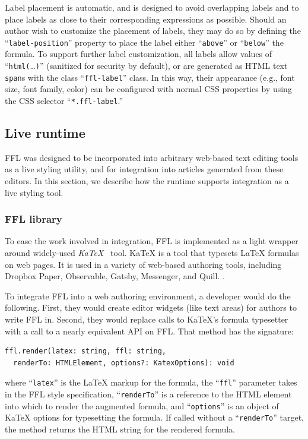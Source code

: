 Label placement is automatic, and is designed to avoid overlapping labels and to place labels as close to their corresponding expressions as possible.  Should an author wish to customize the placement of labels, they may do so by defining the ``\texttt{label-position}'' property to place the label either ``\texttt{above}'' or ``\texttt{below}'' the formula.  To support further label customization, all labels allow values of ``\texttt{html(}\dots\texttt{)}'' (sanitized for security by default), or are generated as HTML text \texttt{span}s with the class ``\texttt{ffl-label}'' class. In this way, their appearance (e.g., font size, font family, color) can be configured with normal CSS properties by using the CSS selector ``\texttt{*.ffl-label}.''

\subsection{Live runtime}

FFL was designed to be incorporated into arbitrary web-based text editing tools as a live styling utility, and for integration into articles generated from these editors. In this section, we describe how the runtime supports integration as a live styling tool.

\subsubsection{FFL library}

To ease the work involved in integration, FFL is implemented as a light wrapper around widely-used \textit{KaTeX}~\cite{tool:katex} tool. KaTeX is a tool that typesets LaTeX formulas on web pages. It is used in a variety of web-based authoring tools, including Dropbox Paper, Observable, Gatsby, Messenger, and Quill. .

To integrate FFL into a web authoring environment, a developer would do the following. First, they would create editor widgets (like text areas) for authors to write FFL in. Second, they would replace calls to KaTeX's formula typesetter with a call to a nearly equivalent API on FFL. That method has the signature:

\begin{Verbatim}
ffl.render(latex: string, ffl: string,
  renderTo: HTMLElement, options?: KatexOptions): void
\end{Verbatim}
where ``\texttt{latex}'' is the LaTeX markup for the formula, the ``\texttt{ffl}'' parameter takes in the FFL style specification, ``\texttt{renderTo}'' is a reference to the HTML element into which to render the augmented formula, and ``\texttt{options}'' is an object of KaTeX options for typesetting the formula. If called without a ``\texttt{renderTo}'' target, the method returns the HTML string for the rendered formula.

